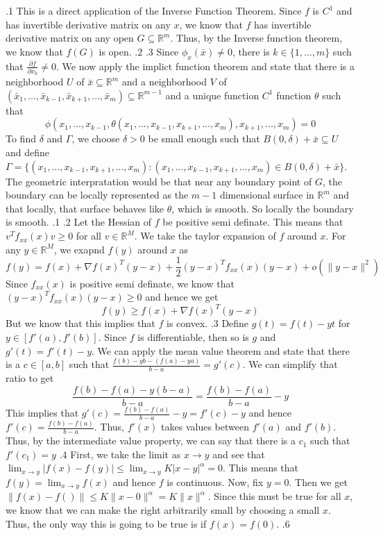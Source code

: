 \documentclass[12pt]{exam}
\begin{document}
\begin{questions}
.1\newline
This is a direct application of the Inverse Function Theorem. Since $f$ is $C^1$ and has invertible derivative matrix on any $x$, we know that $f$ has invertible derivative matrix on any open $G \subseteq \mathbb{R}^m$. Thus, by the Inverse function theorem, we know that $f(G)$ is open.
.2
.3 \newline
Since $\phi_x(\bar{x}) \neq 0$, there is $k \in \{1,...,m\}$ such that $\frac{\partial f}{\partial x_k} \neq 0$. We now apply the implict function theorem and state that there is a neighborhood $U$ of $\bar{x} \subseteq \mathbb{R}^m$ and a neighborhood $V$ of $(\bar{x}_1,..., \bar{x}_{k-1}, \bar{x}_{k+1}, ..., \bar{x}_m) \subseteq \mathbb{R}^{m-1}$ and a unique function $C^1$ function $\theta$ such that \[\phi(x_1, ..., x_{k-1}, \theta(x_1,...,x_{k-1},x_{k+1},...,x_m),x_{k+1},...,x_m) = 0\] To find $\delta$ and $\Gamma$, we choose $\delta>0$ be small enough such that $B(0, \delta) + \bar{x} \subseteq U$ and define $\Gamma = \{(x_1,...,x_{k-1},x_{k+1},...,x_m ): (x_1,...,x_{k-1},x_{k+1},...,x_m) \in B(0, \delta) + \bar{x} \}$. The geometric interpratation would be that near any boundary point of $G$, the boundary can be locally represented as the $m-1$ dimensional surface in $\mathbb{R}^m$ and that locally, that surface behaves like $\theta$, which is smooth. So locally the boundary is smooth.  
.1 
.2 \newline
Let the Hessian of $f$ be positive semi definate. This means that $v^Tf_{xx}(x)v \geq 0$ for all $v\in \mathbb{R}^M$. We take the taylor expansion of $f$ around $x$. For any $y\in \mathbb{R}^M$, we exapnd $f(y)$ around $x$ as \[
f(y)=f(x)+\nabla f(x)^T(y-x)+\frac12(y-x)^Tf_{xx}(x)(y-x)+o(\|y-x\|^2)\]
Since $f_{xx}(x)$ is positive semi definate, we know that $(y-x)^Tf_{xx}(x)(y-x) \geq 0$ and hence we get \[f(y)\geq f(x)+\nabla f(x)^T(y-x)\] But we know that this implies that $f$ is convex. 
.3\newline
Define $g(t) = f(t)-yt$ for $y \in [f'(a), f'(b)]$. Since $f$ is differentiable, then so is $g$ and $g'(t) = f'(t)-y$. We can apply the mean value theorem and state that there is a $c\in [a,b]$ such that $\frac{f(b)-yb-(f(a)-ya)}{b-a} = g'(c)$. We can simplify that ratio to get \[\frac{f(b)-f(a)-y(b-a)}{b-a} = \frac{f(b)-f(a)}{b-a}-y\]
This implies that $g'(c) = \frac{f(b)-f(a)}{b-a}-y = f'(c)-y$ and hence $f'(c) = \frac{f(b)-f(a)}{b-a}$. Thus, $f'(x)$ takes values between $f'(a)$ and $f'(b)$. Thus, by the intermediate value property, we can say that there is a $c_1$ such that $f'(c_1) = y$ 
.4\newline
First, we take the limit as $x\to y$ and see that $\lim_{x\to y}|f(x)-f(y)|\leq\lim_{x\to y}K|x-y|^\alpha=0$. This means that $f(y)=\lim_{x\to y}f(x)$ and hence $f$ is continuous. Now, fix $y=0$. Then we get $\|f(x)-f()\|\leq K\|x-0\|^\alpha=K\|x\|^\alpha$. Since this must be true for all $x$, we know that we can make the right arbitrarily small by choosing a small $x$. Thus, the only way this is going to be true is if $f(x)=f(0)$. 
.6
\begin{parts}

\end{parts}
\end{questions}
\end{document}
